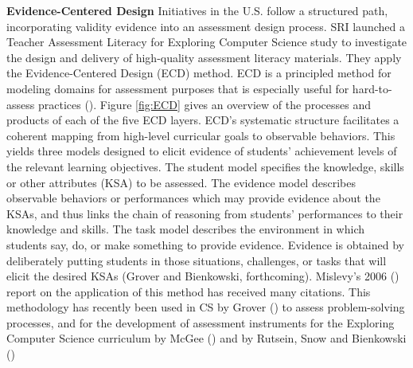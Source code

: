 

%



\textbf{Evidence-Centered Design}\newline
Initiatives in the U.S. follow a structured path, incorporating validity evidence into an assessment design process. SRI launched a Teacher Assessment Literacy for Exploring Computer Science study to investigate the design and delivery of high-quality assessment literacy materials. They apply the Evidence-Centered Design (ECD) method. ECD is a principled method for modeling domains for assessment purposes that is especially useful for hard-to-assess practices (\cite{grover2016assessing}). Figure \ref{fig:ECD} gives an overview of the processes and products of each of the five ECD layers. ECD's systematic structure facilitates a coherent mapping from high-level curricular goals to observable behaviors. This yields three models designed to elicit evidence of students' achievement levels of the relevant learning objectives. The student model specifies the knowledge, skills or other attributes (KSA) to be assessed. The evidence model describes observable behaviors or performances which may provide evidence about the KSAs, and thus links the chain of reasoning from students’ performances to their knowledge and skills. The task model describes the environment in which students say, do, or make something to provide evidence. Evidence is obtained by deliberately putting students in those situations, challenges, or tasks that will elicit the desired KSAs (Grover and Bienkowski, forthcoming). Mislevy's 2006 (\cite{mislevy2006implications}) report on the application of this method has received many citations. This methodology has recently been used in CS by Grover (\cite{grover2017measuring}) to assess problem-solving processes, and for the development of assessment instruments for the Exploring Computer Science curriculum by McGee (\cite{McGee2018ECS}) and by Rutsein, Snow and Bienkowski (\cite{rutstein2014computational}\cite{snow2017CTECD})





